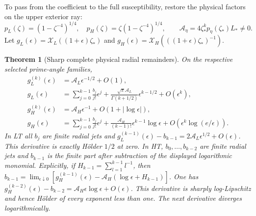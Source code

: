 \documentclass[11pt]{article}
\numberwithin{equation}{section}
\newtheorem{theorem}{Theorem}[section]
\theoremstyle{definition}
\begin{document}
To pass from the coefficient to the full susceptibility, restore the
physical factors on the upper exterior ray:
\[
 p_L(\zeta)=(1-\zeta^{-4})^{1/4},\quad
 p_H(\zeta)=\zeta(1-\zeta^{-4})^{1/4},\qquad
 \mathcal A_\eta=4\zeta_*^k p_\eta(\zeta_*)L_*\ne0.
\]
Let $g_L(\epsilon)=\mathcal X_L((1+\epsilon)\zeta_*)$
and $g_H(\epsilon)=\mathcal X_H(((1+\epsilon)\zeta_*)^{-1})$.

\begin{theorem}[Sharp complete physical radial remainders]
\label{iso:new:radial:full}
On the respective selected prime-angle families,
\begin{align*}
 g_L^{(k)}(\epsilon)&=\mathcal A_L\epsilon^{-1/2}+O(1),\\
 g_L(\epsilon)&=\sum_{j=0}^{k-1}\frac{b_j}{j!}\epsilon^j
 +\frac{\sqrt\pi\mathcal A_L}{\Gamma(k+1/2)}\epsilon^{k-1/2}
 +O(\epsilon^k),\\
 g_H^{(k)}(\epsilon)&=\mathcal A_H\epsilon^{-1}
                                   +O(1+|\log\epsilon|),\\
 g_H(\epsilon)&=\sum_{j=0}^{k-1}\frac{b_j}{j!}\epsilon^j
 +\frac{\mathcal A_H}{(k-1)!}\epsilon^{k-1}\log\epsilon
 +O(\epsilon^k\log(e/\epsilon)).
\end{align*}
In LT all $b_j$ are finite radial jets and
$g_L^{(k-1)}(\epsilon)-b_{k-1}
=2\mathcal A_L\epsilon^{1/2}+O(\epsilon)$.
This derivative is exactly H\"older $1/2$ at zero.
In HT, $b_0,\ldots,b_{k-2}$ are finite radial jets and
$b_{k-1}$ is the finite part after subtraction of the
displayed logarithmic monomial. Explicitly, if
$H_{k-1}=\sum_{l=1}^{k-1}l^{-1}$, then
$b_{k-1}=\lim_{\epsilon\downarrow0}
[g_H^{(k-1)}(\epsilon)-\mathcal A_H(\log\epsilon+H_{k-1})]$.
One has
$g_H^{(k-2)}(\epsilon)-b_{k-2}
=\mathcal A_H\epsilon\log\epsilon+O(\epsilon)$.
This derivative is sharply log-Lipschitz and hence H\"older of every
exponent less than one. The next derivative diverges logarithmically.
\end{theorem}
\end{document}
